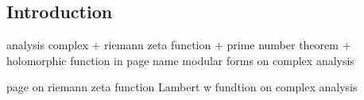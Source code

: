 
\subsection{Introduction}

analysis complex
+ riemann zeta function
+ prime number theorem
+ holomorphic function in page name
modular forms on complex analysis

page on riemann zeta function
Lambert w fundtion on complex analysis


